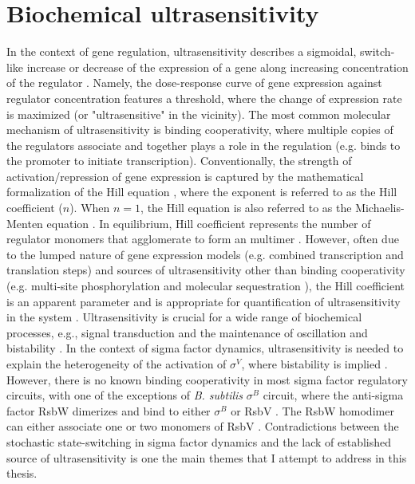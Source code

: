 \section{Biochemical ultrasensitivity}
\label{sec:biochemical_ultrasensitivity}

In the context of gene regulation, ultrasensitivity describes a sigmoidal,
switch-like increase or decrease of the expression of a gene along
increasing concentration of the regulator \cite{ferrell14a}.
Namely, the dose-response curve of gene expression against regulator
concentration features a threshold, where the change of expression rate
is maximized (or "ultrasensitive" in the vicinity).
The most common molecular mechanism of ultrasensitivity is binding
cooperativity, where multiple copies of the regulators associate and
together plays a role in the regulation (e.g. binds to the promoter
to initiate transcription).
Conventionally, the strength of activation/repression of gene expression
is captured by the mathematical formalization of the Hill equation
\cite{hill13,alon06},
where the exponent is referred to as the Hill coefficient ($n$).
When $n = 1$, the Hill equation is also referred to as the Michaelis-
Menten equation \cite{michaelis13,john12}.
In equilibrium, Hill coefficient represents the number of
regulator monomers that agglomerate to form an multimer \cite{alon06}.
However, often due to the lumped nature of gene expression models
(e.g. combined transcription and translation steps) and sources of
ultrasensitivity other than binding cooperativity (e.g.
multi-site phosphorylation and molecular sequestration \cite{ferrell14b}),
the Hill coefficient is an apparent parameter and is appropriate
for quantification of ultrasensitivity in the system \cite{ferrell14a}.
Ultrasensitivity is crucial for a wide range of biochemical processes,
e.g., signal transduction and the maintenance of oscillation and 
bistability \cite{ferrell14c,gardner00c}.
In the context of sigma factor dynamics, ultrasensitivity is needed
to explain the heterogeneity of the activation of $\sigma^V$,
where bistability is implied \cite{schwall21a}.
However, there is no known binding cooperativity in most sigma
factor regulatory circuits, with one of the exceptions of \textit{B. subtilis}
$\sigma^B$ circuit, where the anti-sigma factor RsbW dimerizes and 
bind to either $\sigma^B$ or RsbV \cite{dufour94}.
The RsbW homodimer can either associate one or two monomers of
RsbV \cite{narula16}.
Contradictions between the stochastic state-switching in sigma factor
dynamics and the lack of established source of ultrasensitivity
is one the main themes that I attempt to address in this thesis.
